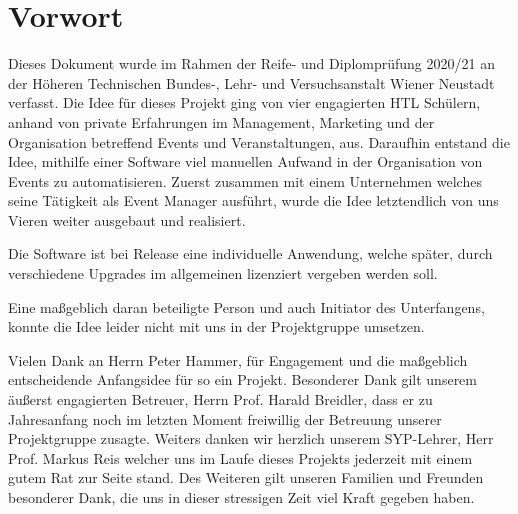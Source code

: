 \chapter{Vorwort}
Dieses Dokument wurde im Rahmen der Reife- und Diplomprüfung 2020/21 an der Höheren Technischen Bundes-, Lehr- und Versuchsanstalt Wiener Neustadt verfasst. Die Idee für dieses Projekt ging von vier engagierten HTL Schülern, anhand von
private Erfahrungen im Management, Marketing und der Organisation betreffend Events und Veranstaltungen, aus. Daraufhin entstand die Idee, mithilfe einer Software viel manuellen Aufwand in der Organisation von Events zu automatisieren. Zuerst zusammen mit einem Unternehmen
welches seine Tätigkeit als Event Manager ausführt, wurde die Idee letztendlich von uns Vieren weiter ausgebaut und realisiert.

Die Software ist bei Release eine individuelle Anwendung, welche später, durch verschiedene Upgrades im allgemeinen lizenziert vergeben werden soll.

Eine maßgeblich daran beteiligte Person und auch Initiator des Unterfangens, konnte die Idee leider nicht mit uns in der Projektgruppe umsetzen.

Vielen Dank an Herrn Peter Hammer, für Engagement und die maßgeblich entscheidende Anfangsidee für so ein Projekt.
Besonderer Dank gilt unserem äußerst engagierten Betreuer, Herrn Prof. Harald Breidler, dass er zu Jahresanfang noch im letzten Moment freiwillig der Betreuung unserer Projektgruppe zusagte.
Weiters danken wir herzlich unserem SYP-Lehrer, Herr Prof. Markus Reis
welcher uns im Laufe dieses Projekts jederzeit mit einem gutem Rat zur Seite stand. 
Des Weiteren gilt unseren Familien und Freunden besonderer Dank, die uns in dieser stressigen Zeit viel Kraft gegeben haben.